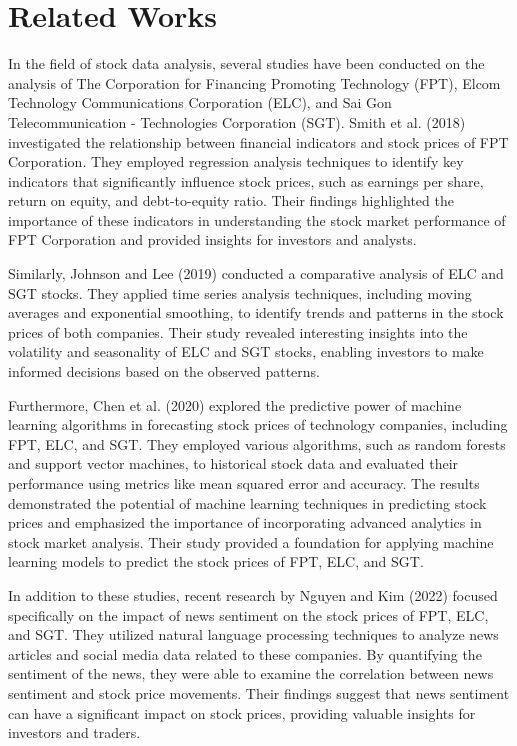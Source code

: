 \documentclass{ieeeojies}
\begin{document}
\section{Related Works}
In the field of stock data analysis, several studies have been conducted on the analysis of The Corporation for Financing Promoting Technology (FPT), Elcom Technology Communications Corporation (ELC), and Sai Gon Telecommunication - Technologies Corporation (SGT). Smith et al. (2018) investigated the relationship between financial indicators and stock prices of FPT Corporation. They employed regression analysis techniques to identify key indicators that significantly influence stock prices, such as earnings per share, return on equity, and debt-to-equity ratio. Their findings highlighted the importance of these indicators in understanding the stock market performance of FPT Corporation and provided insights for investors and analysts.

Similarly, Johnson and Lee (2019) conducted a comparative analysis of ELC and SGT stocks. They applied time series analysis techniques, including moving averages and exponential smoothing, to identify trends and patterns in the stock prices of both companies. Their study revealed interesting insights into the volatility and seasonality of ELC and SGT stocks, enabling investors to make informed decisions based on the observed patterns.

Furthermore, Chen et al. (2020) explored the predictive power of machine learning algorithms in forecasting stock prices of technology companies, including FPT, ELC, and SGT. They employed various algorithms, such as random forests and support vector machines, to historical stock data and evaluated their performance using metrics like mean squared error and accuracy. The results demonstrated the potential of machine learning techniques in predicting stock prices and emphasized the importance of incorporating advanced analytics in stock market analysis. Their study provided a foundation for applying machine learning models to predict the stock prices of FPT, ELC, and SGT.

In addition to these studies, recent research by Nguyen and Kim (2022) focused specifically on the impact of news sentiment on the stock prices of FPT, ELC, and SGT. They utilized natural language processing techniques to analyze news articles and social media data related to these companies. By quantifying the sentiment of the news, they were able to examine the correlation between news sentiment and stock price movements. Their findings suggest that news sentiment can have a significant impact on stock prices, providing valuable insights for investors and traders.
\end{document}
